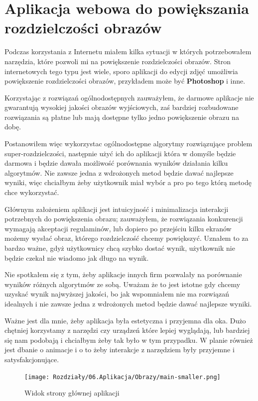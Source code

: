 \chapter{Aplikacja webowa do powiększania rozdzielczości obrazów}

Podczas korzystania z Internetu miałem kilka sytuacji w których potrzebowałem narzędzia, które pozwoli mi na powiększenie rozdzielczości obrazów. Stron internetowych tego typu jest wiele, sporo aplikacji do edycji zdjęć umożliwia powiększenie rozdzielczości obrazów, przykładem może być \textbf{Photoshop} i inne.

Korzystając z rozwiązań ogólnodostępnych zauważyłem, że darmowe aplikacje nie gwarantują wysokiej jakości obrazów wyjściowych, zaś bardziej rozbudowane rozwiązania są płatne lub mają dostępne tylko jedno powiększenie obrazu na dobę. 

Postanowiłem więc wykorzystac ogólnodostępne algorytmy rozwiązujące problem super-rozdzielczości, następnie użyć ich do aplikacji która w domyśle będzie darmowa i będzie dawała możliwość porównania wyników działania kilku algorytmów. Nie zawsze jedna z wdrożonych metod będzie dawać najlepsze wyniki, więc chciałbym żeby użytkownik miał wybór a pro po tego którą metodę chce wykorzystać.

Głównym założeniem aplikacji jest intuicyjność i minimalizacja interakcji potrzebnych do powiększenia obrazu; zauważyłem, że rozwiązania konkurencji wymagają akceptacji regulaminów, lub dopiero po przejściu kilku ekranów możemy wysłać obraz, którego rozdzielczość chcemy powiększyć. Uznałem to za bardzo ważne, gdyż użytkownicy chcą szybko dostać wynik, użytkownik nie będzie czekał nie wiadomo jak długo na wynik.

Nie spotkałem się z tym, żeby aplikacje innych firm pozwalały na porównanie wyników różnych algorytmów ze sobą. Uważam że to jest istotne gdy chcemy uzyskać wynik najwyższej jakości, bo jak wspomniałem nie ma rozwiązań idealnych i nie zawsze jedna z wdrożonych metod będzie dawać najlepsze wyniki.

Ważne jest dla mnie, żeby aplikacja była estetyczna i przyjemna dla oka. Dużo chętniej korzystamy z narzędzi czy urządzeń które lepiej wyglądają, lub bardziej się nam podobają i chciałbym żeby tak było w tym przypadku. W planie również jest dbanie o animacje i o to żeby interakcje z narzędziem były przyjemne i satysfakcjonujące.

\newpage
\begin{figure}[ht]
    \centering
    \begin{minipage}[t]{0.85\linewidth}
        \texttt{[image: Rozdziały/06.Aplikacja/Obrazy/main-smaller.png]}  
        \caption{Widok strony głównej aplikacji}
        \label{fig:image80}
    \end{minipage}
\end{figure}


